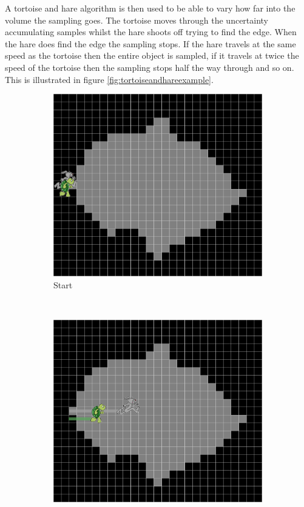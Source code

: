 A tortoise and hare algorithm is then used to be able to vary how far into the volume the sampling goes. The tortoise moves through the uncertainty accumulating samples whilst the hare shoots off trying to find the edge. When the hare does find the edge the sampling stops. If the hare travels at the same speed as the tortoise then the entire object is sampled, if it travels at twice the speed of the tortoise then the sampling stops half the way through and so on. This is illustrated in figure \ref{fig:tortoiseandhareexample}.

\begin{figure}[H]
  \centering
  \begin{subfigure}[b]{0.32\textwidth}
    \includegraphics[width=\textwidth]{images/surface/tortoise_and_hare_1.png}
    \caption*{Start}
    \label{fig:tortoiseandhare1}
  \end{subfigure}%
  ~ %
  \begin{subfigure}[b]{0.32\textwidth}
    \includegraphics[width=\textwidth]{images/surface/tortoise_and_hare_2.png}

\end{subfigure}
\end{figure}

